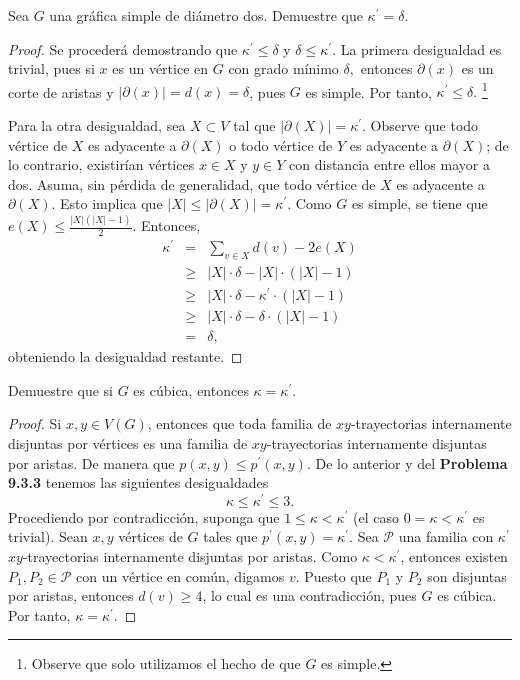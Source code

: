 \documentclass[12pt]{article}
\newenvironment{problem}[2][Problema]{\begin{trivlist}
\item[\hskip \labelsep {\bfseries #1}\hskip \labelsep {\bfseries #2.}]}{\end{trivlist}}
\begin{document}
\newpage
\begin{problem}{9.3.3} Sea $G$ una gráfica simple de diámetro dos. Demuestre que $\kappa^\prime = \delta.$
\end{problem}
\begin{proof}
Se procederá demostrando que $\kappa^\prime \leq \delta$ y $\delta \leq \kappa^\prime$. La primera desigualdad es trivial, pues si $x$ es un vértice en $G$ con grado mínimo $\delta,$ entonces $\partial(x)$ es un corte de aristas y $\lvert \partial(x) \rvert = d(x) = \delta$, pues $G$ es simple. Por tanto, $\kappa^\prime \leq \delta.$ \footnote{Observe que solo utilizamos el hecho de que $G$ es simple.}

Para la otra desigualdad, sea $X \subset V$ tal que $\lvert \partial(X) \rvert = \kappa^\prime$. Observe que todo vértice de $X$ es adyacente a $\partial(X)$ o todo vértice de $Y$ es adyacente a $\partial(X)$; de lo contrario, existirían vértices $x \in X$ y $y \in Y$ con distancia entre ellos mayor a dos. Asuma, sin pérdida de generalidad, que todo vértice de $X$ es adyacente a $\partial(X).$ Esto implica que $\lvert X \rvert \leq \lvert \partial(X) \rvert = \kappa^\prime$. Como $G$ es simple, se tiene que $e(X) \leq \frac{\vert X \rvert (\lvert X \rvert -1)}{2}$. Entonces,
\begin{eqnarray*}
\kappa^\prime &=& \sum_{v \in X} d(v) - 2 e(X) \\
&\geq& \lvert X \rvert \cdot \delta - \lvert X \rvert \cdot (\lvert X \rvert -1 ) \\
&\geq& \lvert X \rvert \cdot \delta -  \kappa^\prime \cdot (\lvert X \rvert -1 )\\
&\geq& \lvert X \rvert \cdot \delta - \delta \cdot (\lvert X \rvert - 1) \\
&=& \delta,
\end{eqnarray*}
obteniendo la desigualdad restante.
\end{proof}


\begin{problem}{9.3.5} Demuestre que si $G$ es cúbica, entonces $\kappa = \kappa^\prime.$
\end{problem}
\begin{proof}
 Si $x,y \in V(G)$, entonces que toda familia  de $xy$-trayectorias internamente disjuntas por vértices es una familia de $xy$-trayectorias internamente disjuntas por aristas. De manera que $p(x,y) \leq p^\prime(x,y).$ De lo anterior y del \textbf{Problema 9.3.3} tenemos las siguientes desigualdades
$$\kappa \leq \kappa^\prime \leq 3.$$
Procediendo por contradicción, suponga que $1 \leq \kappa < \kappa^\prime$ (el caso $0 = \kappa < \kappa^\prime$ es trivial). Sean $x,y$ vértices de $G$ tales que $p^\prime(x,y) = \kappa^\prime.$ Sea $\mathcal{P}$ una familia con $\kappa^\prime$ $xy$-trayectorias internamente disjuntas por aristas. Como $\kappa < \kappa^\prime$, entonces existen $P_1, P_2 \in \mathcal{P}$ con un vértice en común, digamos $v.$ Puesto que $P_1$ y $P_2$ son disjuntas por aristas, entonces $d(v) \geq 4$, lo cual es una contradicción, pues $G$ es cúbica. Por tanto, $\kappa = \kappa^\prime.$
\end{proof}
\end{document}
